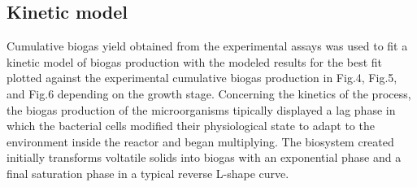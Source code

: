 \subsection{Kinetic model}
Cumulative biogas yield obtained from the experimental assays was used to fit a kinetic model of biogas production with the modeled results for the best fit plotted against the experimental cumulative biogas production in Fig.4, Fig.5, and Fig.6 depending on the growth stage.
Concerning the kinetics of the process, the biogas production of the microorganisms tipically displayed a lag phase in which the bacterial cells modified their physiological state to adapt to the environment inside the reactor and began multiplying.  The biosystem  created initially transforms voltatile solids into biogas with an exponential phase and a final saturation phase in a typical reverse L-shape curve.